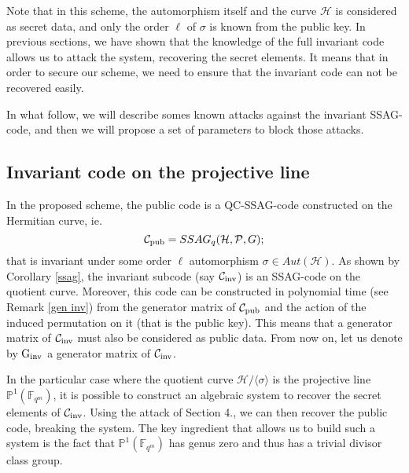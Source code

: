 \documentclass[10pt]{article}
\newcommand{\s}{\vspace{0.3cm}}
\newcommand{\C}{\mathcal{C}}
\newcommand{\fqm}{\mathbb{F}_{q^m}}
\newcommand{\PR}{\mathcal{P}}
\begin{document}
\s

Note that in this scheme, the automorphism itself and the curve $\mathcal{H}$ is considered as secret data, and only the order $\ell$ of $\sigma$ is known from the public key. In previous sections, we have shown that the knowledge of the full invariant code allows us to attack the system, recovering the secret elements. It means that in order to secure our scheme, we need to ensure that the invariant code can not be recovered easily. 

\s

In what follow, we will describe somes known attacks against the invariant SSAG-code, and then we will propose a set of parameters to block those attacks.

\s

\subsection{Invariant code on the projective line}

\s

In the proposed scheme, the public code is a QC-SSAG-code constructed on the Hermitian curve, ie. 
\[\mathcal{C}_{\rm pub} = SSAG_q(\mathcal{H},\PR,G);\]
that is invariant under some order $\ell$ automorphism $\sigma \in Aut(\mathcal{H})$. As shown by Corollary \ref{ssag}, the invariant subcode (say $\mathcal{C}_{\rm inv}$) is an SSAG-code on the quotient curve. Moreover, this code can be constructed in polynomial time (see Remark \ref{gen inv}) from the generator matrix of $\mathcal{C}_{\rm pub}$ and the action of the induced permutation on it (that is the public key). This means that a generator matrix of $\C_{\rm inv}$ must also be considered as public data. From now on, let us denote by $\rm G_{inv}$ a generator matrix of $\mathcal{C}_{\rm inv}$.  

\s

In the particular case where the quotient curve $\mathcal{H}/\langle\sigma\rangle$ is the projective line $\mathbb{P}^1(\fqm)$, it is possible to construct an algebraic system to recover the secret elements of $\C_{\rm inv}$. Using the attack of Section 4., we can then recover the public code, breaking the system. The key ingredient that allows us to build such a system is the fact that $\mathbb{P}^1(\fqm)$ has genus zero and thus has a trivial divisor class group. 

\s
\end{document}
